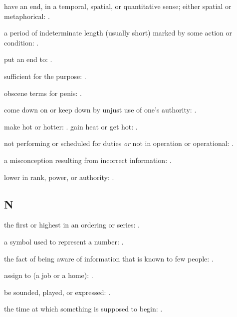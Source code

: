   have an end, in a temporal, spatial, or quantitative sense; either spatial or metaphorical:   .

  a period of indeterminate length (usually short) marked by some action or condition:   .

  put an end to: .

  sufficient for the purpose: .

  obscene terms for penis:   .

  come down on or keep down by unjust use of one's authority:   .

  make hot or hotter:   . gain heat or get hot:   .

  not performing or scheduled for duties \textit{or} not in operation or operational: .

  a misconception resulting from incorrect information:   .

  lower in rank, power, or authority: .

\subsection*{N}

  the first or highest in an ordering or series:   .

  a symbol used to represent a number:   .

  the fact of being aware of information that is known to few people: .

  assign to (a job or a home): .

  be sounded, played, or expressed: .

  the time at which something is supposed to begin:   .

